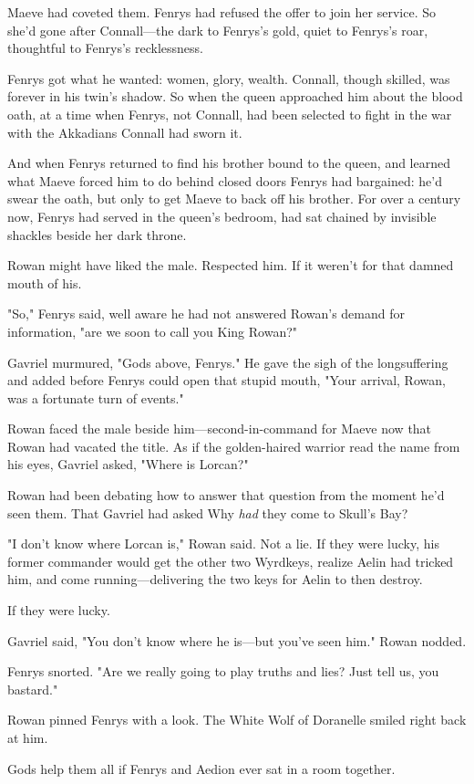 Maeve had coveted them. Fenrys had refused the offer to join her service. So she'd gone after Connall---the dark to Fenrys's gold, quiet to Fenrys's roar, thoughtful to Fenrys's recklessness.

Fenrys got what he wanted: women, glory, wealth. Connall, though skilled, was forever in his twin's shadow. So when the queen approached him about the blood oath, at a time when Fenrys, not Connall, had been selected to fight in the war with the Akkadians  Connall had sworn it.

And when Fenrys returned to find his brother bound to the queen, and learned what Maeve forced him to do behind closed doors  Fenrys had bargained: he'd swear the oath, but only to get Maeve to back off his brother. For over a century now, Fenrys had served in the queen's bedroom, had sat chained by invisible shackles beside her dark throne.

Rowan might have liked the male. Respected him. If it weren't for that damned mouth of his.

"So," Fenrys said, well aware he had not answered Rowan's demand for information, "are we soon to call you King Rowan?"

Gavriel murmured, "Gods above, Fenrys." He gave the sigh of the longsuffering and added before Fenrys could open that stupid mouth, "Your arrival, Rowan, was a fortunate turn of events."

Rowan faced the male beside him---second-in-command for Maeve now that Rowan had vacated the title. As if the golden-haired warrior read the name from his eyes, Gavriel asked, "Where is Lorcan?"

Rowan had been debating how to answer that question from the moment he'd seen them. That Gavriel had asked  Why \emph{had} they come to Skull's Bay?

"I don't know where Lorcan is," Rowan said. Not a lie. If they were lucky, his former commander would get the other two Wyrdkeys, realize Aelin had tricked him, and come running---delivering the two keys for Aelin to then destroy.

If they were lucky.

Gavriel said, "You don't know where he is---but you've seen him." Rowan nodded.

Fenrys snorted. "Are we really going to play truths and lies? Just tell us, you bastard."

Rowan pinned Fenrys with a look. The White Wolf of Doranelle smiled right back at him.

Gods help them all if Fenrys and Aedion ever sat in a room together.

